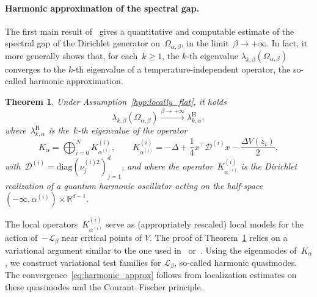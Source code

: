 \documentclass[a4]{article}
\newcommand{\cL}{\mathcal{L}}
\newcommand{\R}{\mathbb{R}}
\newcommand{\1}{\mathbbm 1}
\newtheorem{theorem}{Theorem}
\begin{document}
    \paragraph{Harmonic approximation of the spectral gap.}
   The first main result of~\cite{BLS24} gives a quantitative and computable estimate of the spectral gap of the Dirichlet generator on~$\Omega_{\alpha,\beta}$, in the limit~$\beta\to+\infty$. In fact, it more generally shows that, for each~$k\geq 1$, the $k$-th eigenvalue $\lambda_{k,\beta}(\Omega_{\alpha,\beta})$ converges to the $k$-th eigenvalue of a temperature-independent operator, the so-called harmonic approximation.
    \begin{theorem}
        \label{thm:harmonic}
        Under Assumption~\ref{hyp:locally_flat}, it holds
        \begin{equation}
            \label{eq:harmonic_approx}
            \lambda_{k,\beta}(\Omega_{\alpha,\beta})\xrightarrow{\beta\to+\infty} \lambda_{k,\alpha}^{\mathrm{H}},
        \end{equation}
        where~$\lambda_{k,\alpha}^{\mathrm{H}}$ is the~$k$-th eigenvalue of the operator
        \begin{equation}
            \label{eq:harmonic_approximation}
            K_\alpha = \bigoplus_{i=0}^N K^{(i)}_{\alpha^{(i)}},\qquad K_{\alpha^{(i)}}^{(i)} = -\Delta + \frac14x^\top \mathcal D^{(i)}x -\frac{\Delta V(z_i)}2,
        \end{equation}
        with~$\mathcal D^{(i)} = \mathrm{diag}\left(\nu_j^{(i)2}\right)_{j=1}^d$, and where the operator~$K_{\alpha^{(i)}}^{(i)}$ is the Dirichlet realization of a quantum harmonic oscillator acting on the half-space~$(-\infty,\alpha^{(i)})\times \R^{d-1}$.
    \end{theorem}
    The local operators~$K_{\alpha^{(i)}}^{(i)}$ serve as (appropriately rescaled) local models for the action of~$-\cL_\beta$ near critical points of $V$.
    The proof of Theorem~\ref{thm:harmonic} relies on a variational argument similar to the one used in~\cite[Theorem 11.1]{CFKS87} or~\cite{S83}.
    Using the eigenmodes of~$K_\alpha$, we construct variational test families for $\cL_\beta$, so-called harmonic quasimodes. The convergence~\eqref{eq:harmonic_approx} follows from localization estimates on these quasimodes and the Courant--Fischer principle.
\end{document}
